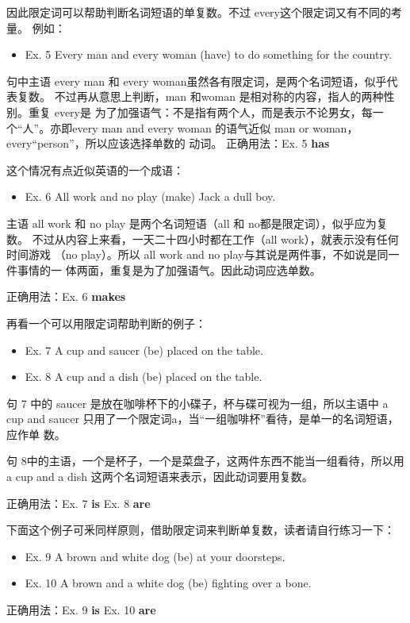 因此限定词可以帮助判断名词短语的单复数。不过 every这个限定词又有不同的考量。
例如：
\begin{mybox}
  \begin{itemize}
  \item Ex. 5 Every man and every woman (have) to do something for the country.
  \end{itemize}
  句中主语 every man 和 every woman虽然各有限定词，是两个名词短语，似乎代表复数。
  不过再从意思上判断，man 和woman 是相对称的内容，指人的两种性别。重复 every是
  为了加强语气：不是指有两个人，而是表示不论男女，每一个“人”。亦即every man
  and every woman 的语气近似 man or woman，every“person”，所以应该选择单数的
  动词。
  \tcblower
  正确用法：Ex. 5 \textbf{has}
\end{mybox}

这个情况有点近似英语的一个成语：
\begin{mybox}
  \begin{itemize}
  \item   Ex. 6 All work and no play (make) Jack a dull boy.
  \end{itemize}
  主语 all work 和 no play 是两个名词短语（all 和 no都是限定词），似乎应为复数。
  不过从内容上来看，一天二十四小时都在工作（all work），就表示没有任何时间游戏
  （no play）。所以 all work and no play与其说是两件事，不如说是同一件事情的一
  体两面，重复是为了加强语气。因此动词应选单数。

  \tcblower
  正确用法：Ex. 6 \textbf{makes}
\end{mybox}

再看一个可以用限定词帮助判断的例子：
\begin{mybox}
  \begin{itemize}
  \item   Ex. 7 A cup and saucer (be) placed on the table.
  \item   Ex. 8 A cup and a dish (be) placed on the table.
  \end{itemize}
  句 7 中的 saucer 是放在咖啡杯下的小碟子，杯与碟可视为一组，所以主语中 a cup
  and saucer 只用了一个限定词a，当“一组咖啡杯”看待，是单一的名词短语，应作单
  数。

  句 8中的主语，一个是杯子，一个是菜盘子，这两件东西不能当一组看待，所以用 a
  cup and a dish 这两个名词短语来表示，因此动词要用复数。

  \tcblower
  正确用法：Ex. 7 \textbf{is} \qquad\quad Ex. 8 \textbf{are}
\end{mybox}

下面这个例子可釆同样原则，借助限定词来判断单复数，读者请自行练习一下：
\begin{mybox}
  \begin{itemize}
  \item   Ex. 9 A brown and white dog (be) at your doorsteps.
  \item   Ex. 10 A brown and a white dog (be) fighting over a bone.
  \end{itemize}
  \tcblower
  正确用法：Ex. 9 \textbf{is} \qquad\quad Ex. 10 \textbf{are}
\end{mybox}

